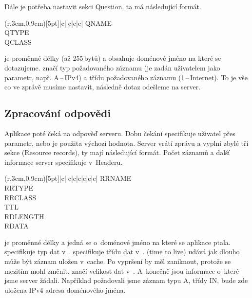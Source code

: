 \documentclass[11pt, a4paper, titlepage]{article}
\begin{document}
	Dále je potřeba nastavit sekci Question, ta má následující formát.

	\begin{table}[H]
		\centering
		\begin{TAB}(r,3cm,0.9cm)[5pt]{|c|}{|c|c|c|}
			QNAME \\
			QTYPE \\
			QCLASS \\
		\end{TAB}
	\end{table}

	 je proměnné délky (až 255\,bytů) a obsahuje doménové jméno na které se dotazujeme.  značí typ požadovaného záznamu (je zadán uživatelem jako parametr, např. A\,--\,IPv4) a  třídu požadovaného záznamu (1\,--\,Internet). To je vše co ve zprávě musíme nastavit, následně dotaz odešleme na server.



	\subsection{Zpracování odpovědi}

	Aplikace poté čeká na odpověď serveru. Dobu čekání specifikuje uživatel přes parametr, nebo je použita výchozí hodnota. Server vrátí zprávu a vyplní zbylé tři sekce (Resource records), ty mají následující formát. Počet záznamů a další informace server specifikuje v~Headeru.

	\begin{table}[H]
		\centering
		\begin{TAB}(r,3cm,0.9cm)[5pt]{|c|}{|c|c|c|c|c|c|}
			RRNAME \\
			RRTYPE \\
			RRCLASS \\
			TTL \\
			RDLENGTH \\
			RDATA \\
		\end{TAB}
	\end{table}

	 je proměnné délky a jedná se o~doménové jméno na které se aplikace ptala.  specifikuje typ dat v~.  specifikuje třídu dat v~.  (time to live) udává jak dlouho může být záznam uložen v~cache. Po vypršení by měl zaniknout, protože se mezitím mohl změnit.  značí velikost dat v~. A~konečně  jsou informace o~které jsme server žádali. Například požadovali jsme záznam typu A, třídy IN, bude zde uložena IPv4 adresa doménového jména.
\end{document}
